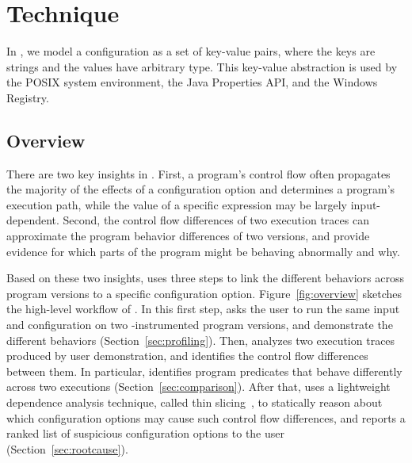 
\section{Technique}
\label{sec:technique}

In \ourtool, we model a configuration as a set of key-value
pairs, where the keys are strings and the values have
arbitrary type. 
This key-value abstraction
is used by the POSIX system environment, the Java
Properties API, and the Windows Registry.


\subsection{Overview}

There are two key insights in \ourtool. First,
a program's control flow often propagates the majority of
the effects of a configuration option and determines
a program's execution path, while the value of a
specific expression may be largely input-dependent.
Second, the control flow differences of two execution
traces can approximate the program behavior differences
of two versions, and provide evidence
for which parts of the program might be behaving
abnormally and why.

Based on these two insights, \ourtool uses three
steps to link the different behaviors across program
versions to a specific configuration option.
Figure~\ref{fig:overview} sketches the high-level workflow of
\ourtool. 
In this first step, \ourtool asks the
user to run the same input and
configuration on two \ourtool-instrumented program versions,
and demonstrate the different behaviors (Section~\ref{sec:profiling}).
Then, \ourtool analyzes two execution traces produced
by user demonstration, and identifies the control flow differences between
them. In particular, \ourtool identifies program predicates
that behave differently across two executions
(Section~\ref{sec:comparison}).
After that, \ourtool uses a lightweight dependence
analysis technique, called thin slicing~\cite{},
to statically reason about which configuration
options may cause such control flow differences,
and reports a ranked list of 
suspicious configuration options to the user (Section~\ref{sec:rootcause}).

